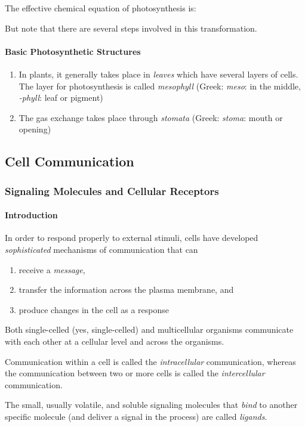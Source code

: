 \documentclass[12pt]{article}
\begin{document}
The effective chemical equation of photosynthesis is:


But note that there are several steps involved in this transformation.

\paragraph{Basic Photosynthetic Structures}
\begin{enumerate}
    \item In plants, it generally takes place in \emph{leaves} which have several layers of cells. The layer for photosynthesis is called \emph{mesophyll} (Greek: \emph{meso}: in the middle, \emph{-phyll}: leaf or pigment)
    \item The gas exchange takes place through \emph{stomata} (Greek: \emph{stoma}: mouth or opening)
\end{enumerate}

\subsection{Cell Communication}
\subsubsection{Signaling Molecules and Cellular Receptors}
\paragraph{Introduction}
In order to respond properly to external stimuli, cells have developed \emph{sophisticated} mechanisms of communication that can
\begin{enumerate}
    \item receive a \emph{message},
    \item transfer the information across the plasma membrane, and
    \item produce changes in the cell as a response
\end{enumerate}
Both single-celled (yes, single-celled) and multicellular organisms communicate with each other at a cellular level and across the organisms.

Communication within a cell is called the \emph{intracellular} communication, whereas the communication between two or more cells is called the \emph{intercellular} communication.

The small, usually volatile, and soluble signaling molecules that \emph{bind} to another specific molecule (and deliver a signal in the process) are called \emph{ligands}.
\end{document}
